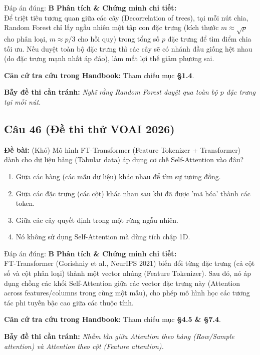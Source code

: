 \documentclass[10pt,a4paper]{article}
\begin{document}
\begin{solbox}{Đáp án đúng: \textbf{B}}
\textbf{Phân tích \& Chứng minh chi tiết:} \\
Để triệt tiêu tương quan giữa các cây (Decorrelation of trees), tại mỗi nút chia, Random Forest chỉ lấy ngẫu nhiên một tập con đặc trưng (kích thước $m \approx \sqrt{p}$ cho phân loại, $m \approx p/3$ cho hồi quy) trong tổng số $p$ đặc trưng để tìm điểm chia tối ưu. Nếu duyệt toàn bộ đặc trưng thì các cây sẽ có nhánh đầu giống hệt nhau (do đặc trưng mạnh nhất áp đảo), làm mất lợi thế giảm phương sai.

\vspace{0.4em}
\textbf{Căn cứ tra cứu trong Handbook:} Tham chiếu mục \textbf{§1.4}.

\vspace{0.4em}
\textbf{Bẫy đề thi cần tránh:} \textit{Nghĩ rằng Random Forest duyệt qua toàn bộ $p$ đặc trưng tại mỗi nút.}
\end{solbox}
\vspace{0.5em}


\subsection*{Câu 46 (Đề thi thử VOAI 2026)}
\textbf{Đề bài:} (Khó) Mô hình FT-Transformer (Feature Tokenizer + Transformer) dành cho dữ liệu bảng (Tabular data) áp dụng cơ chế Self-Attention vào đâu?

\begin{enumerate}[label=\textbf{\Alph*.}]
    \item Giữa các hàng (các mẫu dữ liệu) khác nhau để tìm sự tương đồng.
    \item Giữa các đặc trưng (các cột) khác nhau sau khi đã được 'mã hóa' thành các token.
    \item Giữa các cây quyết định trong một rừng ngẫu nhiên.
    \item Nó không sử dụng Self-Attention mà dùng tích chập 1D.
\end{enumerate}

\begin{solbox}{Đáp án đúng: \textbf{B}}
\textbf{Phân tích \& Chứng minh chi tiết:} \\
FT-Transformer (Gorishniy et al., NeurIPS 2021) biến đổi từng đặc trưng (cả cột số và cột phân loại) thành một vector nhúng (Feature Tokenizer). Sau đó, nó áp dụng chồng các khối Self-Attention giữa các vector đặc trưng này (Attention across features/columns trong cùng một mẫu), cho phép mô hình học các tương tác phi tuyến bậc cao giữa các thuộc tính.

\vspace{0.4em}
\textbf{Căn cứ tra cứu trong Handbook:} Tham chiếu mục \textbf{§4.5 \& §7.4}.

\vspace{0.4em}
\textbf{Bẫy đề thi cần tránh:} \textit{Nhầm lẫn giữa Attention theo hàng (Row/Sample attention) và Attention theo cột (Feature attention).}
\end{solbox}
\vspace{0.5em}
\end{document}
